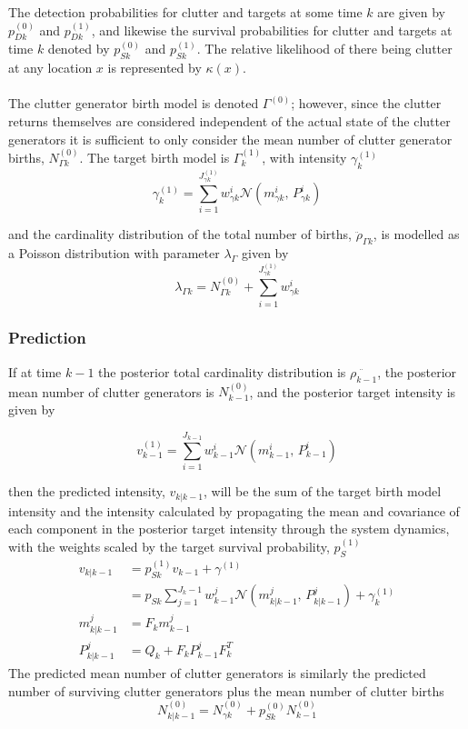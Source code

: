 \documentclass{article}
\begin{document}
The detection probabilities for clutter and targets at some time $k$ are given by $p_{Dk}^{(0)}$ and $p_{Dk}^{(1)}$, and likewise the survival probabilities for clutter and targets at time $k$ denoted by $p_{Sk}^{(0)}$ and $p_{Sk}^{(1)}$. The relative likelihood of there being clutter at any location $x$ is represented by $\kappa(x)$. \\
\\
The clutter generator birth model is denoted $\Gamma^{(0)}$; however, since the clutter returns themselves are considered independent of the actual state of the clutter generators it is sufficient to only consider the mean number of clutter generator births, $N_{\Gamma k}^{(0)}$. The target birth model is $\Gamma^{(1)}_k$, with intensity $\gamma^{(1)}_k$
\begin{equation}
  \label{eq:tgt_birth}
\gamma^{(1)}_k = \sum_{i=1}^{J_{\gamma k}^{(1)}}w_{\gamma k}^i \mathcal{N}(m_{\gamma k}^i,\,P_{\gamma k}^i)
\end{equation}

and the cardinality distribution of the total number of births, $\ddot{\rho}_{\Gamma k}$, is modelled as a Poisson distribution with parameter $\lambda_\Gamma$ given by
\begin{equation}
  \label{eq:rho_gamma}
\lambda_{\Gamma k} = N_{\Gamma k}^{(0)} + \sum_{i=1}^{J_{\gamma k}^{(1)}}w_{\gamma k}^i 
\end{equation}

\subsubsection*{Prediction}
If at time $k-1$ the posterior total cardinality distribution is $\ddot{\rho_{k-1}}$, the posterior mean number of clutter generators is $N^{(0)}_{k-1}$, and the posterior target intensity is given by

\begin{equation}
  \label{eq:vk}
  v^{(1)}_{k-1} = \sum_{i = 1}^{J_{k-1}}w_{k-1}^i \mathcal{N}(m_{k-1}^i,\,P_{k-1}^i)
\end{equation}

then the predicted intensity, $v_{k|k-1}$, will be the sum of the target birth model intensity and the intensity calculated by propagating the mean and covariance of each component in the posterior target intensity through the system dynamics, with the weights scaled by the target survival probability, $p_S^{(1)}$
\begin{align}
  \label{eq:v_predict}
  v_{k|k-1} &= p_{Sk}^{(1)}v_{k-1} + \gamma^{(1)}\\
           &= p_{Sk}\sum_{j = 1}^{J_k-1}w_{k-1}^j \mathcal{N}(m_{k|k-1}^j,\,P_{k|k-1}^j) + \gamma^{(1)}_k\\
  m_{k|k-1}^j &= F_km_{k-1}^j\\
  P_{k|k-1}^j &= Q_k+F_kP_{k-1}^jF_k^T
\end{align}
The predicted mean number of clutter generators is similarly the predicted number of surviving clutter generators plus the mean number of clutter births
\begin{equation}
  \label{eq:N0_predict}
  N_{k|k-1}^{(0)} = N_{\gamma k}^{(0)} + p_{Sk}^{(0)}N_{k-1}^{(0)}
\end{equation}
\end{document}
